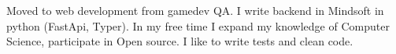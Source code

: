 \documentclass[a4paper, 12pt]{article}
\begin{document}
\setlength\parindent{.3in}
Moved to web development from gamedev QA. I write backend in Mindsoft in python (FastApi, Typer).
In my free time I expand my knowledge of Computer Science, participate in Open source.
I like to write tests and clean code.
\end{document}
